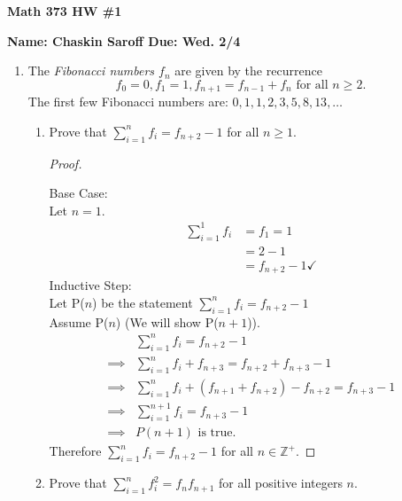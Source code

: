 \documentclass[11 pt]{article}
\theoremstyle{definition}
\theoremstyle{definition}
\def\ZZ{\mathbb{Z}}
\begin{document}
\centerline{\bf Math 373  \hfill HW \#1}
\centerline{\bf Name: Chaskin Saroff \hfill Due: Wed. 2/4}

\begin{enumerate}
\item The {\it Fibonacci numbers $f_n$} are given by the recurrence
%
$$
f_0 = 0, f_1 = 1, f_{n+1} = f_{n-1} + f_n \textrm{ for all } n \geq 2.
$$
%
The first few Fibonacci numbers are: $0, 1, 1, 2, 3, 5, 8, 13, \dots$  
	\begin{enumerate}
	\item Prove that $\sum\limits_{i = 1}^n f_i = f_{n+2} - 1$ for all $n \geq 1$.
        
        \begin{proof}

            \

            Base Case:\\
            Let $n=1$. \\
            \begin{align} 
                \sum\limits_{i = 1}^1 f_i &= f_{1} = 1 \\
                                            &= 2-1 \\
                                            &=f_{n+2} - 1 \checkmark
            \end{align}
            Inductive Step: \\
            Let P($n$) be the statement $\sum\limits_{i = 1}^n f_i = f_{n+2} - 1$\\
            Assume P($n$) (We will show P($n+1$)).
            \begin{align}
                         &\sum\limits_{i = 1}^n f_i = f_{n+2} - 1 \\
                \implies &\sum\limits_{i = 1}^n f_i + f_{n+3} = f_{n+2} + f_{n+3} - 1 \\
                \implies &\sum\limits_{i = 1}^n f_i + (f_{n+1} + f_{n+2}) - f_{n+2} = f_{n+3} - 1 \\
                \implies &\sum\limits_{i = 1}^{n+1} f_i = f_{n+3} - 1 \\
                \implies & P(n+1) \text{ is true.} 
            \end{align}
            Therefore $\sum\limits_{i = 1}^n f_i = f_{n+2} - 1$ for all $n \in \ZZ^+$.
        \end{proof}
        \pagebreak%

	\item Prove that $\sum\limits_{i=1}^n f_i^2 = f_nf_{n+1}$ for all positive integers $n$.
        

\end{enumerate}
\end{enumerate}
\end{document}
